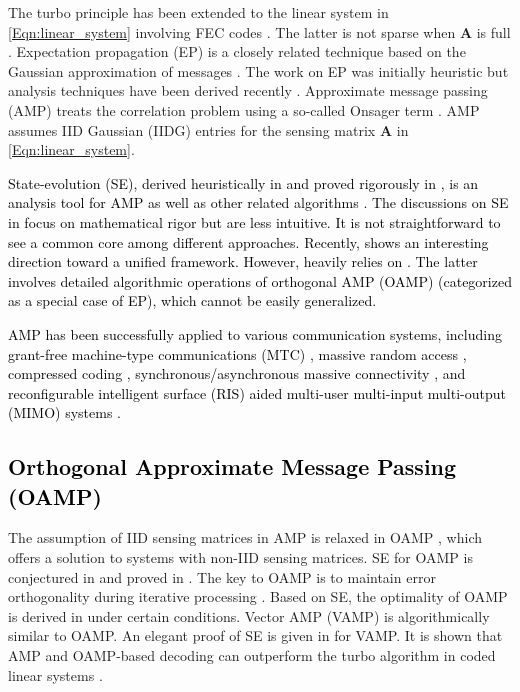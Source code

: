 \documentclass[journal]{IEEEtran}
\renewcommand{\bf}{\bm}
\newcommand{\LL}[1]{\textcolor{black}{#1}}
\begin{document}

 

The turbo principle has been extended to the linear system in  \eqref{Eqn:linear_system} involving FEC codes \cite{Wang1999}. The latter is not sparse when $\bf{A}$ is full \cite{Tuchler2002, Douillard1995, Loeliger2007,  Yuan2014, LiuLei2019TSP}. Expectation propagation (EP) is a closely related technique based on the Gaussian approximation of messages \cite{Cakmak2018, Minka2001}. The work on EP was initially heuristic but analysis techniques have been derived recently \cite{Takeuchi2017}. Approximate message passing (AMP) treats the correlation problem using a so-called Onsager term \cite{Donoho2009}. AMP assumes IID Gaussian (IIDG) entries for the sensing matrix $\bf{A}$ in \eqref{Eqn:linear_system}. 

\LL{State-evolution (SE), derived heuristically in \cite{Donoho2009} and proved rigorously in \cite{Bayati2011}, is an analysis tool for AMP as well as other related algorithms \cite{Rangan2016, Ma2016, Takeuchi2017, Dudeja2022, LiuAMP2019, MaLiu2018}. The discussions on SE in \cite{Rangan2016, Ma2016, Takeuchi2017, Dudeja2022, LiuAMP2019,Bayati2011, MaLiu2018} focus on mathematical rigor but are less intuitive. It is not straightforward to see a common core among different approaches. Recently, \cite{Takeuchi2019} shows an interesting direction toward a unified framework. However, \cite{Takeuchi2019} heavily relies on \cite{Takeuchi2017}. The latter involves detailed algorithmic operations of orthogonal AMP (OAMP) \cite{Ma2016} (categorized as a special case of EP), which cannot be easily generalized.}

\LL{AMP has been successfully applied to various communication systems, including grant-free machine-type communications (MTC) \cite{Senel2018}, massive random access \cite{ChenAMP2019}, compressed coding \cite{LiangAMP2020}, synchronous/asynchronous massive connectivity \cite{SunAMP2019,ZhuAMP2021}, and reconfigurable intelligent surface (RIS) aided multi-user multi-input multi-output (MIMO) systems \cite{Ruan2022}.}
\LL{\subsection{Orthogonal Approximate Message Passing (OAMP)}}
The assumption of IID sensing matrices in AMP is relaxed in OAMP \cite{Ma2016}, which offers a solution to systems with non-IID sensing matrices. SE for OAMP is conjectured in \cite{Ma2016} and proved in \cite{Takeuchi2017}. The key to OAMP is to maintain error orthogonality during iterative processing \cite{Ma2016}.  Based on SE, the optimality of OAMP is derived in \cite{Ma2016} under certain conditions. Vector AMP (VAMP) \cite{Rangan2016} is algorithmically similar to OAMP. An elegant proof of SE is given in \cite{Rangan2016} for VAMP. It is shown that AMP and OAMP-based decoding can outperform the turbo algorithm in coded linear systems \cite{LiuAMP2019, MaLiu2018}.
\end{document}
